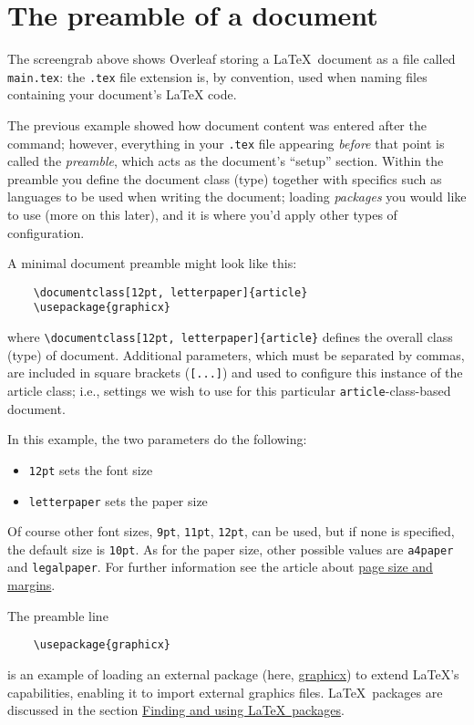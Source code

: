 \section{The preamble of a document}

The screengrab above shows Overleaf storing a \LaTeX\ document as a file called \verb|main.tex|: the \verb|.tex| file extension is, by convention, used when naming files containing your document’s LaTeX code.

The previous example showed how document content was entered after the \\\verb|| command; however, everything in your \verb|.tex| file appearing \emph{before} that point is called the \emph{preamble}, which acts as the document’s “setup” section. Within the preamble you define the document class (type) together with specifics such as languages to be used when writing the document; loading \emph{packages} you would like to use (more on this later), and it is where you’d apply other types of configuration.

A minimal document preamble might look like this:

\begin{tcolorbox}
\begin{verbatim}
    \documentclass[12pt, letterpaper]{article}
    \usepackage{graphicx}
\end{verbatim}
\end{tcolorbox}

where \verb|\documentclass[12pt, letterpaper]{article}| defines the overall class (type) of document. Additional parameters, which must be separated by commas, are included in square brackets (\verb|[...]|) and used to configure this instance of the article class; i.e., settings we wish to use for this particular \verb|article|-class-based document.

In this example, the two parameters do the following:

\begin{itemize}
    \item \verb|12pt| sets the font size
    \item \verb|letterpaper| sets the paper size
\end{itemize}

Of course other font sizes, \verb|9pt|, \verb|11pt|, \verb|12pt|, can be used, but if none is specified, the default size is \verb|10pt|. As for the paper size, other possible values are \verb|a4paper| and \verb|legalpaper|. For further information see the article about \href{https://www.overleaf.com/learn/latex/Page_size_and_margins}{page size and margins}.

The preamble line

\begin{tcolorbox}
\begin{verbatim}
    \usepackage{graphicx}
\end{verbatim}
\end{tcolorbox}

is an example of loading an external package (here, \href{https://ctan.org/pkg/graphicx?lang=en}{graphicx}) to extend \LaTeX’s capabilities, enabling it to import external graphics files. \LaTeX\ packages are discussed in the section \hyperref[sec:16]{Finding and using \LaTeX\ packages}.